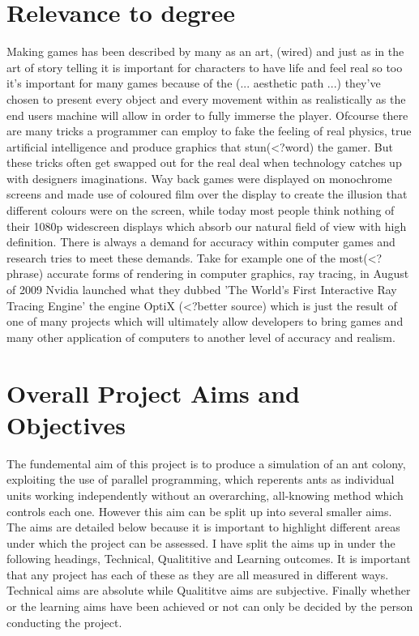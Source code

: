 \documentclass{report}
\begin{document}
\section{Relevance to degree}
Making games has been described by many as an art, (wired) and just as in the art of story telling it is important for characters to have life and feel real so too it's important for many games because of the (... aesthetic path ...) they've chosen to present every object and every movement within as realistically as the end users machine will allow in order to fully immerse the player. Ofcourse there are many tricks a programmer can employ to fake the feeling of real physics, true artificial intelligence and produce graphics that stun(<?word) the gamer. But these tricks often get swapped out for the real deal when technology catches up with designers imaginations. Way back games were displayed on monochrome screens and made use of coloured film over the display to create the illusion that different colours were on the screen, while today most people think nothing of their 1080p widescreen displays which absorb our natural field of view with high definition. There is always a demand for accuracy within computer games and research tries to meet these demands. Take for example one of the most(<?phrase) accurate forms of rendering in computer graphics, ray tracing, in August of 2009 Nvidia launched what they dubbed 'The World's First Interactive Ray Tracing Engine' the engine OptiX (<?better source) which is just the result of one of many projects which will ultimately allow developers to bring games and many other application of computers to another level of accuracy and realism.

\section {Overall Project Aims and Objectives}
The fundemental aim of this project is to produce a simulation of an ant colony, exploiting the use of parallel programming, which reperents ants as individual units working independently without an overarching, all-knowing method which controls each one. However this aim can be split up into several smaller aims. The aims are detailed below because it is important to highlight different areas under which the project can be assessed. I have split the aims up in under the following headings, Technical, Qualititive and Learning outcomes. It is important that any project has each of these as they are all measured in different ways. Technical aims are absolute while Qualititve aims are subjective. Finally whether or the learning aims have been achieved or not can only be decided by the person conducting the project.
\end{document}
